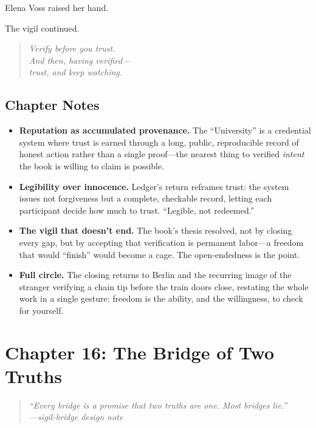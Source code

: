 \documentclass[12pt,letterpaper]{book}
\providecommand{\tightlist}{\setlength{\itemsep}{0pt}\setlength{\parskip}{0pt}}
\begin{document}
Elena Voss raised her hand.

The vigil continued.

\begin{quote}
\itshape Verify before you trust.\\
And then, having verified---\\
trust, and keep watching.
\end{quote}

\hypertarget{chapter-15-notes}{%
\subsection{Chapter Notes}\label{chapter-15-notes}}

\begin{itemize}
\tightlist
\item
  \textbf{Reputation as accumulated provenance.} The ``University'' is a
  credential system where trust is earned through a long, public, reproducible
  record of honest action rather than a single proof---the nearest thing to
  verified \emph{intent} the book is willing to claim is possible.
\item
  \textbf{Legibility over innocence.} Ledger's return reframes trust: the system
  issues not forgiveness but a complete, checkable record, letting each
  participant decide how much to trust. ``Legible, not redeemed.''
\item
  \textbf{The vigil that doesn't end.} The book's thesis resolved, not by closing
  every gap, but by accepting that verification is permanent labor---a freedom
  that would ``finish'' would become a cage. The open-endedness is the point.
\item
  \textbf{Full circle.} The closing returns to Berlin and the recurring image of
  the stranger verifying a chain tip before the train doors close, restating the
  whole work in a single gesture: freedom is the ability, and the willingness, to
  check for yourself.
\end{itemize}


\hypertarget{chapter-16-the-bridge-of-two-truths}{%
\section{Chapter 16: The Bridge of Two
Truths}\label{chapter-16-the-bridge-of-two-truths}}

\begin{quote}
\itshape ``Every bridge is a promise that two truths are one. Most bridges
lie.''\\
\normalfont\hfill---sigil-bridge design note
\end{quote}
\end{document}
